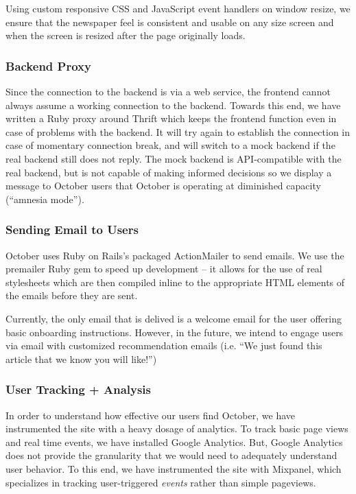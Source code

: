 \documentclass[11pt,letterpaper,titlepage]{article}
\begin{document}
Using custom responsive CSS and JavaScript event handlers on window resize, we ensure that the newspaper feel is consistent and usable on any size screen and when the screen is resized after the page originally loads.

\subsubsection{Backend Proxy}

Since the connection to the backend is via a web service, the frontend cannot always assume a working connection to the backend.
Towards this end, we have written a Ruby proxy around Thrift which keeps the frontend function even in case of problems with the backend.
It will try again to establish the connection in case of momentary connection break, and will switch to a mock backend if the real backend still does not reply. The mock backend is API-compatible with the real backend, but is not capable of making informed decisions so we display a message to October users that October is operating at diminished capacity (``amnesia mode'').

\subsubsection{Sending Email to Users}
October uses Ruby on Rails's packaged ActionMailer to send emails.
We use the premailer Ruby gem to speed up development -- it allows for the use of real stylesheets which are then compiled inline to the appropriate HTML elements of the emails before they are sent.

Currently, the only email that is delived is a welcome email for the user offering basic onboarding instructions.
However, in the future, we intend to engage users via email with customized recommendation emails (i.e. ``We just found this article that we know you will like!'')

\subsubsection{User Tracking + Analysis}
\label{sec:tracking}
In order to understand how effective our users find October, we have instrumented the site with a heavy dosage of analytics.
To track basic page views and real time events, we have installed Google Analytics.
But, Google Analytics does not provide the granularity that we would need to adequately understand user behavior.
To this end, we have instrumented the site with Mixpanel\cite{mixpanel}, which specializes in tracking user-triggered \textit{events} rather than simple pageviews.
\end{document}
